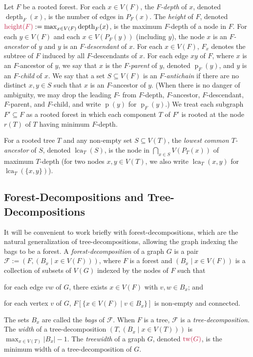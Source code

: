 \documentclass{patmorin}
\makeatletter
\newcommand{\defin}[1]{\emph{\textcolor{brightmaroon}{#1}}}
\def\mathcolor#1#{\@mathcolor{#1}}
\def\@mathcolor#1#2#3{%
  \protect\leavevmode
  \begingroup
    \color#1{#2}#3%
  \endgroup
}
\newcommand{\mathdefin}[1]{\mathcolor{brightmaroon}{#1}}
\DeclareMathOperator{\height}{height}
\DeclareMathOperator{\depth}{depth}
\DeclareMathOperator{\tw}{tw}
\DeclareMathOperator{\lca}{lca}
\DeclareMathOperator{\parent}{p}
\newcommand{\calF}{\mathcal{F}}
\makeatother
\begin{document}
Let $F$ be a rooted forest.  For each $x\in V(F)$, the \defin{$F$-depth} of $x$, denoted \defin{$\depth_F(x)$}, is the number of edges in $P_F(x)$. The \defin{height} of $F$, denoted $\mathdefin{\height(F)}:=\max_{x\in V(F)}\depth_F(x)$, is the maximum $F$-depth of a node in $F$. For each $y\in V(F)$ and each $x\in V(P_F(y))$ (including $y$), the node $x$ is an \defin{$F$-ancestor} of $y$ and $y$ is an \defin{$F$-descendant} of $x$.  For each $x\in V(F)$, \defin{$F_x$} denotes the subtree of $F$ induced by all $F$-descendants of $x$. 
For each edge $xy$ of $F$, where $x$ is an $F$-ancestor of $y$, we say that $x$ is the \defin{$F$-parent} of $y$, denoted \defin{$\parent_F(y)$}, and $y$ is an \defin{$F$-child} of $x$. 
We say that a set $S\subseteq V(F)$ is an \defin{$F$-antichain} if there are no distinct $x,y\in S$ such that $x$ is an $F$-ancestor of $y$.  
(When there is no danger of ambiguity, we may drop the leading $F$- from $F$-depth, $F$-ancestor, $F$-descendant, $F$-parent, and $F$-child, and write $\parent(y)$ for $\parent_F(y)$.) We treat each subgraph $F'\subseteq F$ as a rooted forest in which each component $T$ of $F'$ is rooted at the node $r(T)$ of $T$ having minimum $F$-depth.  

For a rooted tree $T$ and any non-empty set $S\subseteq V(T)$, the \defin{lowest common $T$-ancestor} of $S$, denoted \defin{$\lca_T(S)$}, is the node in $\bigcap_{x\in S} V(P_T(x))$ of maximum $T$-depth (for two nodes $x,y\in V(T)$, we also write $\lca_T(x,y)$ for $\lca_T(\{x,y\})$).

\subsection{Forest-Decompositions and Tree-Decompositions}

It will be convenient to work briefly with forest-decompositions, which are the natural generalization of tree-decompositions, allowing the graph indexing the bags to be a forest.  A \defin{forest-decomposition} of a graph $G$ is a pair $\calF:=(F,(B_x\mid x\in V(F)))$, where $F$ is a forest and $(B_x\mid x\in V(F))$ is a collection of subsets of $V(G)$ indexed by the nodes of $F$ such that  
\begin{enumerate*}[label=(\roman*)]
  \item for each edge $vw$ of $G$, there exists $x\in V(F)$ with $v,w\in B_x$; and
  \item for each vertex $v$ of $G$, $F[\{x\in V(F)\mid v\in B_x\}]$ is non-empty and connected.
\end{enumerate*}  
The sets $B_x$ are called the \defin{bags} of $\calF$. When $F$ is a tree, $\calF$ is a \defin{tree-decomposition}. The \defin{width} of a tree-decomposition $(T,(B_x\mid x\in V(T)))$ is $\max_{x\in V(T)}|B_x|-1$. The \defin{treewidth} of a graph $G$, denoted $\mathdefin{\tw(G)}$, is the minimum width of a tree-decomposition of $G$. 
\end{document}
